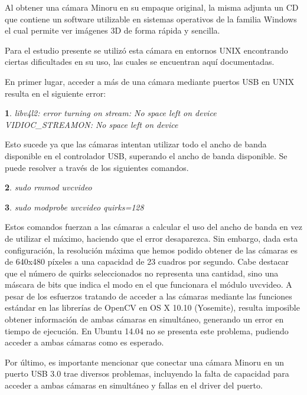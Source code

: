 \documentclass[11pt,a4paper,titlepage]{article}
\newtheorem{mytheorem}{}
\newenvironment{theorem}%
  {\begin{lrbox}{\thmbox}%
   \begin{minipage}{\dimexpr\linewidth-2\fboxsep}
   \begin{mytheorem}}%
  {\end{mytheorem}%
   \end{minipage}%
   \end{lrbox}%
   \begin{trivlist}
     \item[]\colorbox{lightgray}{\usebox\thmbox}
   \end{trivlist}}
\begin{document}
Al obtener una cámara Minoru en su empaque original, la misma adjunta un CD que contiene un software utilizable en sistemas operativos de la familia Windows el cual permite ver imágenes 3D de forma rápida y sencilla.

Para el estudio presente se utilizó esta cámara en entornos UNIX encontrando ciertas dificultades en su uso, las cuales se encuentran aquí documentadas.

En primer lugar, acceder a más de una cámara mediante puertos USB en UNIX resulta en el siguiente error:

\begin{theorem}
libv4l2: error turning on stream: No space left on device VIDIOC\_STREAMON: No space left on device
\end{theorem}

Esto sucede ya que las cámaras intentan utilizar todo el ancho de banda disponible en el controlador USB, superando el ancho de banda disponible. Se puede resolver a través de los siguientes comandos.

\begin{theorem}
sudo rmmod uvcvideo 
\end{theorem}

\begin{theorem}
sudo modprobe uvcvideo quirks=128
\end{theorem}

Estos comandos fuerzan a las cámaras a calcular el uso del ancho de banda en vez de utilizar el máximo, haciendo que el error desaparezca. Sin embargo, dada esta configuración, la resolución máxima que hemos podido obtener de las cámaras es de 640x480 píxeles a una capacidad de 23 cuadros por segundo. Cabe destacar que el número de quirks seleccionados no representa una cantidad, sino una máscara de bits que indica el modo en el que funcionara el módulo uvcvideo.
A pesar de los esfuerzos tratando de acceder a las cámaras mediante las funciones estándar en las librerías de OpenCV en OS X 10.10 (Yosemite), resulta imposible obtener información de ambas cámaras en simultáneo, generando un error en tiempo de ejecución. En Ubuntu 14.04 no se presenta este problema, pudiendo acceder a ambas cámaras como es esperado.

Por último, es importante mencionar que conectar una cámara Minoru en un puerto USB 3.0 trae diversos problemas, incluyendo la falta de capacidad para acceder a ambas cámaras en simultáneo y fallas en el driver del puerto.

\newpage
\end{document}
